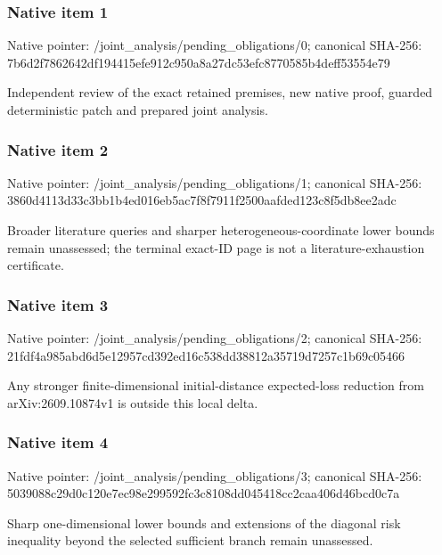 \documentclass[10pt,a4paper]{article}
\begin{document}
\subsubsection{Native item 1}
Native pointer: /joint\_\allowbreak{}analysis/pending\_\allowbreak{}obligations/0; canonical SHA-256: 7b6d2f7862642df194415efe912c950a8a27dc53efc8770585b4deff53554e79

\begingroup\raggedright\sloppy Independent review of the exact retained premises,\allowbreak{} new native proof,\allowbreak{} guarded deterministic patch and prepared joint analysis.\par\endgroup

\subsubsection{Native item 2}
Native pointer: /joint\_\allowbreak{}analysis/pending\_\allowbreak{}obligations/1; canonical SHA-256: 3860d4113d33c3bb1b4ed016eb5ac7f8f7911f2500aafded123c8f5db8ee2adc

\begingroup\raggedright\sloppy Broader literature queries and sharper heterogeneous-coordinate lower bounds remain unassessed;\allowbreak{} the terminal exact-ID page is not a literature-exhaustion certificate.\par\endgroup

\subsubsection{Native item 3}
Native pointer: /joint\_\allowbreak{}analysis/pending\_\allowbreak{}obligations/2; canonical SHA-256: 21fdf4a985abd6d5e12957cd392ed16c538dd38812a35719d7257c1b69c05466

\begingroup\raggedright\sloppy Any stronger finite-dimensional initial-distance expected-loss reduction from arXiv:\allowbreak{}2609.10874v1 is outside this local delta.\par\endgroup

\subsubsection{Native item 4}
Native pointer: /joint\_\allowbreak{}analysis/pending\_\allowbreak{}obligations/3; canonical SHA-256: 5039088c29d0c120e7ec98e299592fc3c8108dd045418cc2caa406d46bcd0c7a

\begingroup\raggedright\sloppy Sharp one-dimensional lower bounds and extensions of the diagonal risk inequality beyond the selected sufficient branch remain unassessed.\par\endgroup
\end{document}
